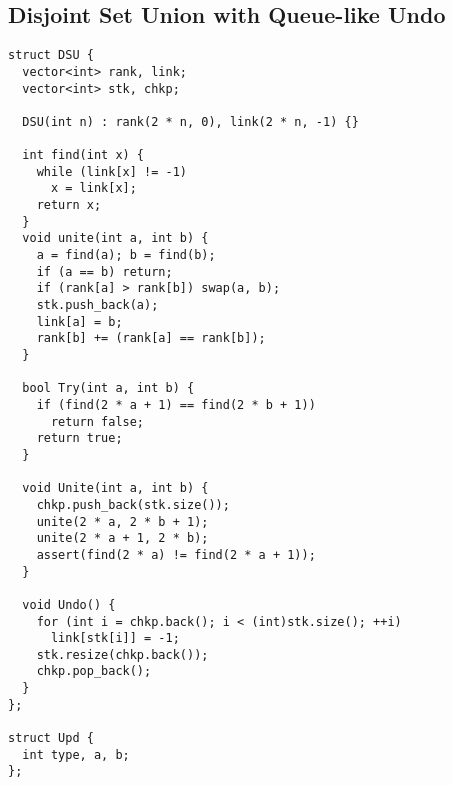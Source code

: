 \newpage

\subsection{Disjoint Set Union with Queue-like Undo}

\begin{minipage}[t]{0.45\linewidth}
\begin{lstlisting}
struct DSU {
  vector<int> rank, link;
  vector<int> stk, chkp;
  
  DSU(int n) : rank(2 * n, 0), link(2 * n, -1) {}
  
  int find(int x) {
    while (link[x] != -1) 
      x = link[x];
    return x;
  }
  void unite(int a, int b) {
    a = find(a); b = find(b);
    if (a == b) return;
    if (rank[a] > rank[b]) swap(a, b);
    stk.push_back(a);
    link[a] = b;
    rank[b] += (rank[a] == rank[b]);
  }
  
  bool Try(int a, int b) {
    if (find(2 * a + 1) == find(2 * b + 1))
      return false;
    return true;
  }
  
  void Unite(int a, int b) {
    chkp.push_back(stk.size());
    unite(2 * a, 2 * b + 1);
    unite(2 * a + 1, 2 * b);
    assert(find(2 * a) != find(2 * a + 1));
  }
  
  void Undo() {
    for (int i = chkp.back(); i < (int)stk.size(); ++i)
      link[stk[i]] = -1;
    stk.resize(chkp.back());
    chkp.pop_back();
  }
};
  
struct Upd {
  int type, a, b;
};

\end{lstlisting}
\end{minipage}
\qquad
